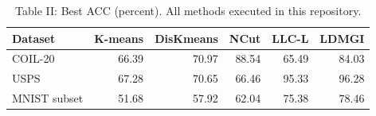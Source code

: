 \begin{table}[ht]
\centering
\caption{Table II: Best ACC (percent). All methods executed in this repository.}
\begin{tabular}{lrrrrr}
\toprule
Dataset & K-means & DisKmeans & NCut & LLC-L & LDMGI \\
\midrule
COIL-20 & 66.39 & 70.97 & 88.54 & 65.49 & 84.03 \\
USPS & 67.28 & 70.65 & 66.46 & 95.33 & 96.28 \\
MNIST subset & 51.68 & 57.92 & 62.04 & 75.38 & 78.46 \\
\bottomrule
\end{tabular}
\end{table}
